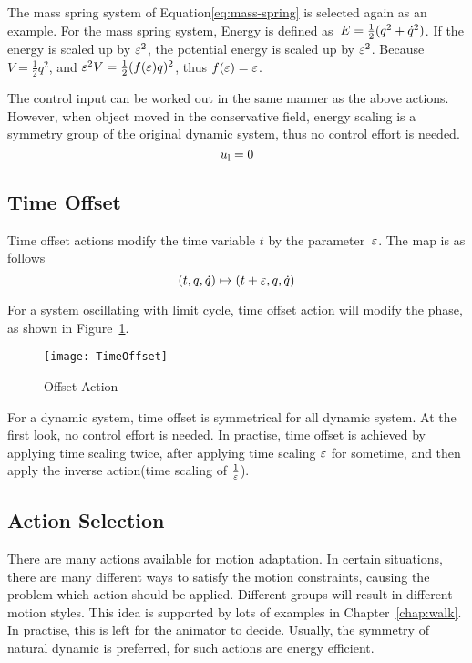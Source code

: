 The mass spring system of Equation\ref{eq:mass-spring} is selected again as an example.
 For the mass spring system, Energy is defined as~$E=\frac{1}{2}(q^2+\dot{q}^2)$.
 If the energy is scaled up by $\varepsilon^2$,  the potential energy is scaled up by $\varepsilon^2$.
 Because $V= \frac{1}{2}q^2$, and $\varepsilon^2 V=\frac{1}{2}(f(\varepsilon)q)^2$, thus $f(\varepsilon)=\varepsilon$.
 
 
The control input can be worked out in the same manner as the above actions.
However, when object moved in the conservative field, energy scaling is a symmetry group of the original dynamic system, thus no control effort is needed.
\[
u_{\mathrm{l}}=0
\]



\subsection*{Time Offset}

Time offset actions modify the time  variable $t$ by the parameter~$\varepsilon$.
The map is as follows
\[
(t,q,\dot{q}) \mapsto (t+\varepsilon,q,\dot{q})
\]


For a system oscillating with limit cycle, time offset action will modify the phase, as shown in Figure~\ref{fig:gtoff}.
\begin{figure}
  \begin{center}
      \texttt{[image: TimeOffset]}
    \caption{Offset Action}
    \label{fig:gtoff}
\end{center}
\end{figure}

For a dynamic system, time offset is symmetrical for all dynamic system.
At the first look, no control effort is needed.
In practise, time offset is achieved by applying time scaling twice, after applying time scaling $\varepsilon$ for sometime, and then apply the inverse action(time scaling of $\frac{1}{\varepsilon}$).


\subsection{Action Selection}
There are many actions available for motion adaptation.
In certain situations, there are many different ways to satisfy the motion constraints, causing the problem which action should be applied.
Different groups will result in different motion styles.
This idea is supported by lots of examples in Chapter~\ref{chap:walk}.
In practise, this is left for the animator to decide.
Usually, the symmetry of natural dynamic is preferred, for such actions are energy efficient.







